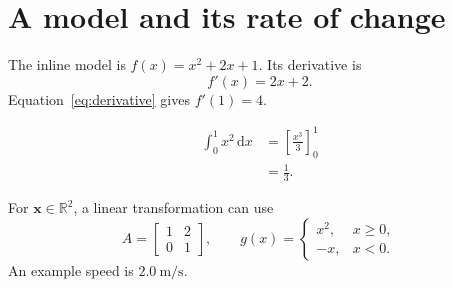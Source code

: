 \documentclass{article}
\begin{document}
\section{A model and its rate of change}
The inline model is \(f(x)=x^2+2x+1\). Its derivative is
\begin{equation}
  f'(x)=2x+2.
  \label{eq:derivative}
\end{equation}
Equation~\ref{eq:derivative} gives \(f'(1)=4\).

\begin{align}
  \int_0^1 x^2\,\mathrm{d}x
    &= \left[\frac{x^3}{3}\right]_0^1 \\
    &= \frac{1}{3}.
\end{align}

For \(\mathbf{x}\in\mathbb{R}^2\), a linear transformation can use
\[
  A=\begin{bmatrix}1&2\\0&1\end{bmatrix},
  \qquad
  g(x)=
  \begin{cases}
    x^2, & x\geq 0,\\
    -x, & x<0.
  \end{cases}
\]
An example speed is \(\qty{2.0}{\metre\per\second}\).
\end{document}
